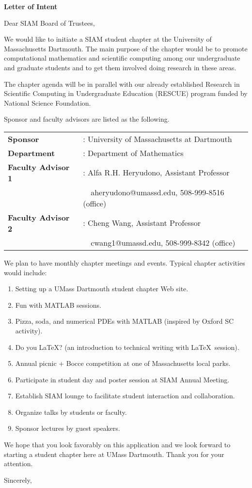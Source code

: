 \documentclass[letterpaper,12pt]{letter}
\begin{document}
\begin{letter}{\textbf{Letter of Intent}}

\opening{Dear SIAM Board of Trustees,}

We would like to initiate a SIAM student chapter at the University of Massachusetts Dartmouth. The main purpose of the chapter would be to promote computational mathematics and scientific computing among our undergraduate and graduate students and to get them involved doing research in these areas.

The chapter agenda will be in parallel with our already established Research in Scientific Computing in Undergraduate Education (RESCUE) program funded by National Science Foundation.

Sponsor and faculty advisors are listed as the following.

\begin{tabular}{ll}
\textbf{Sponsor} &: University of Massachusetts at Dartmouth \\
\textbf{Department} &: Department of Mathematics \\
\textbf{Faculty Advisor 1} &: Alfa R.H. Heryudono, Assistant Professor \\
&\ \ aheryudono@umassd.edu, 508-999-8516 (office) \\
\textbf{Faculty Advisor 2} &: Cheng Wang, Assistant Professor \\
&\ \ cwang1@umassd.edu, 508-999-8342 (office) \\
\end{tabular}

We plan to have monthly chapter meetings and events. Typical chapter activities would include:
\begin{enumerate}
\item Setting up a UMass Dartmouth student chapter Web site.
\item Fun with \textsc{MATLAB} sessions.
\item Pizza, soda, and numerical PDEs with \textsc{MATLAB} (inspired by Oxford SC activity).
\item Do you \LaTeX ? (an introduction to technical writing with \LaTeX\ session).
\item Annual picnic + Bocce competition at one of Massachusetts local parks.
\newpage
\item Participate in student day and poster session at SIAM Annual Meeting.
\item Establish SIAM lounge to facilitate student interaction and collaboration.
\item Organize talks by students or faculty.
\item Sponsor lectures by guest speakers.
\end{enumerate}

We hope that you look favorably on this application and we look forward to starting a student chapter here at UMass Dartmouth. Thank you for your attention.

\closing{Sincerely,}

\end{letter}
\end{document}
